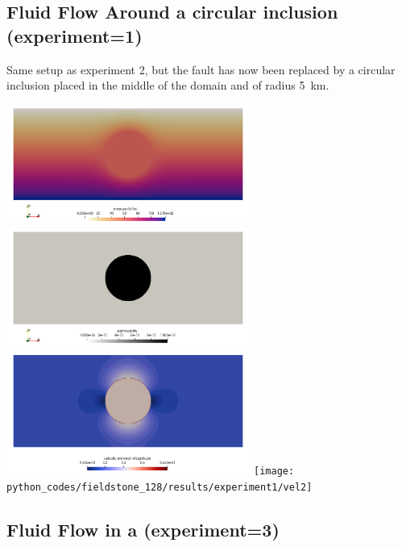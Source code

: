 \subsection*{Fluid Flow Around a circular inclusion (experiment=1)}

Same setup as experiment 2, but the fault has now been replaced by a circular inclusion 
placed in the middle of the domain and of radius 5~\si{\km}.

\begin{center}
\includegraphics[width=8cm]{python_codes/fieldstone_128/results/experiment1/press}
\includegraphics[width=8cm]{python_codes/fieldstone_128/results/experiment1/K}\\
\includegraphics[width=8cm]{python_codes/fieldstone_128/results/experiment1/vel}
\texttt{[image: python\_codes/fieldstone\_128/results/experiment1/vel2]}\\
\end{center}


\subsection*{Fluid Flow in a  (experiment=3)}

